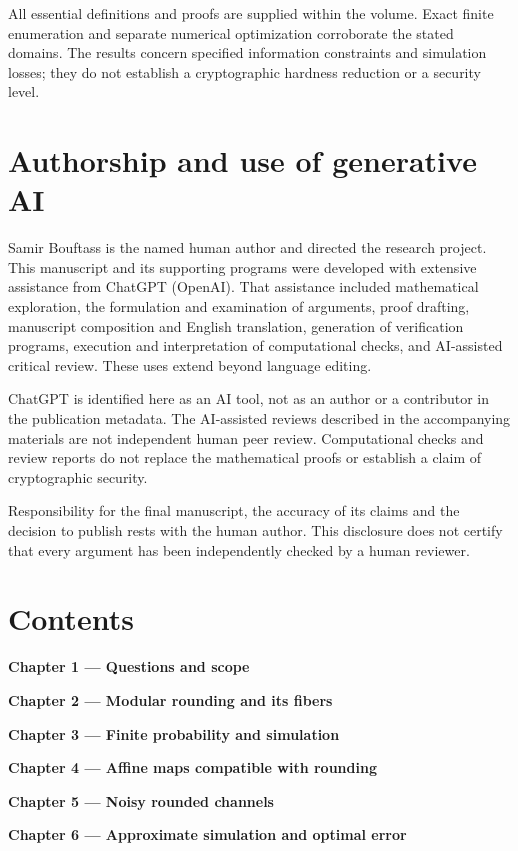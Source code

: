 \documentclass[
]{article}
\begin{document}
All essential definitions and proofs are supplied within the volume.
Exact finite enumeration and separate numerical optimization corroborate
the stated domains. The results concern specified information
constraints and simulation losses; they do not establish a cryptographic
hardness reduction or a security level.

\section{Authorship and use of generative
AI}\label{authorship-and-use-of-generative-ai}

Samir Bouftass is the named human author and directed the research
project. This manuscript and its supporting programs were developed with
extensive assistance from ChatGPT (OpenAI). That assistance included
mathematical exploration, the formulation and examination of arguments,
proof drafting, manuscript composition and English translation,
generation of verification programs, execution and interpretation of
computational checks, and AI-assisted critical review. These uses extend
beyond language editing.

ChatGPT is identified here as an AI tool, not as an author or a
contributor in the publication metadata. The AI-assisted reviews
described in the accompanying materials are not independent human peer
review. Computational checks and review reports do not replace the
mathematical proofs or establish a claim of cryptographic security.

Responsibility for the final manuscript, the accuracy of its claims and
the decision to publish rests with the human author. This disclosure
does not certify that every argument has been independently checked by a
human reviewer.

\section{Contents}\label{contents}

\textbf{Chapter 1 --- Questions and scope}

\textbf{Chapter 2 --- Modular rounding and its fibers}

\textbf{Chapter 3 --- Finite probability and simulation}

\textbf{Chapter 4 --- Affine maps compatible with rounding}

\textbf{Chapter 5 --- Noisy rounded channels}

\textbf{Chapter 6 --- Approximate simulation and optimal error}
\end{document}
